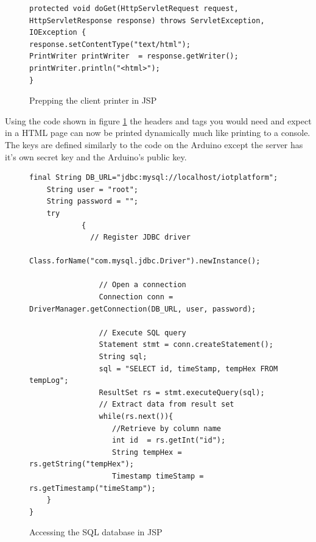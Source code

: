 \begin{figure}[H]
\begin{lstlisting}[style=Java]
protected void doGet(HttpServletRequest request, HttpServletResponse response) throws ServletException, IOException {
response.setContentType("text/html");
PrintWriter printWriter  = response.getWriter();
printWriter.println("<html>");
}
\end{lstlisting}
\caption{Prepping the client printer in JSP}
\label{snip:clientprinterjsp}
\end{figure}

Using the code shown in figure \ref{snip:clientprinterjsp} the headers and tags you would need and expect in a HTML page can now be printed dynamically much like printing to a console. The keys are defined similarly to the code on the Arduino except the server has it's own secret key and the Arduino's public key.

\begin{figure}[H]
\begin{lstlisting}[style=Java]
	final String DB_URL="jdbc:mysql://localhost/iotplatform";
	String user = "root"; 
	String password = "";
	try
	        {
	          // Register JDBC driver
	          Class.forName("com.mysql.jdbc.Driver").newInstance();

	            // Open a connection
	            Connection conn = DriverManager.getConnection(DB_URL, user, password);

	            // Execute SQL query
	            Statement stmt = conn.createStatement();
	            String sql;
	            sql = "SELECT id, timeStamp, tempHex FROM tempLog";
	            ResultSet rs = stmt.executeQuery(sql);
	            // Extract data from result set
	            while(rs.next()){
	               //Retrieve by column name
	               int id  = rs.getInt("id");
	               String tempHex = rs.getString("tempHex");
	               Timestamp timeStamp = rs.getTimestamp("timeStamp");
	}
}
\end{lstlisting}
\caption{Accessing the SQL database in JSP}
\label{snip:jspcode1}
\end{figure}

